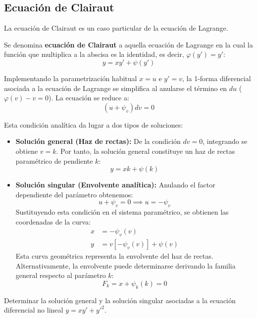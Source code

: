 \subsection{Ecuación de Clairaut}

La ecuación de Clairaut es un caso particular de la ecuación de Lagrange.

\begin{definicion}
Se denomina \textbf{ecuación de Clairaut} a aquella ecuación de Lagrange en la cual la función que multiplica a la abscisa es la identidad, es decir, $\varphi(y') = y'$:
$$
    y = x y' + \psi(y')
$$
\end{definicion}

Implementando la parametrización habitual $x=u$ e $y'=v$, la 1-forma diferencial asociada a la ecuación de Lagrange se simplifica al anularse el término en $du$ ($\varphi(v) - v = 0$). La ecuación se reduce a:
$$
    (u + \psi_v)dv = 0
$$

Esta condición analítica da lugar a dos tipos de soluciones:

\begin{itemize}
    \item \textbf{Solución general (Haz de rectas):}
    De la condición $dv = 0$, integrando se obtiene $v = k$.
    Por tanto, la solución general constituye un haz de rectas paramétrico de pendiente $k$:
    $$
        y = xk + \psi(k)
    $$

    \item \textbf{Solución singular (Envolvente analítica):}
    Anulando el factor dependiente del parámetro obtenemos:
    $$ u + \psi_v = 0 \implies u = -\psi_v $$
    Sustituyendo esta condición en el sistema paramétrico, se obtienen las coordenadas de la curva:
    \begin{align*}
        x &= -\psi_v(v) \\
        y &= v[-\psi_v(v)] + \psi(v)
    \end{align*}
    Esta curva geométrica representa la envolvente del haz de rectas. Alternativamente, la envolvente puede determinarse derivando la familia general respecto al parámetro $k$:
    $$ F_k = x + \psi_k(k) = 0 $$
\end{itemize}

\begin{ejercicio}
Determinar la solución general y la solución singular asociadas a la ecuación diferencial no lineal $y = x y' + y'^2$.
\end{ejercicio}

